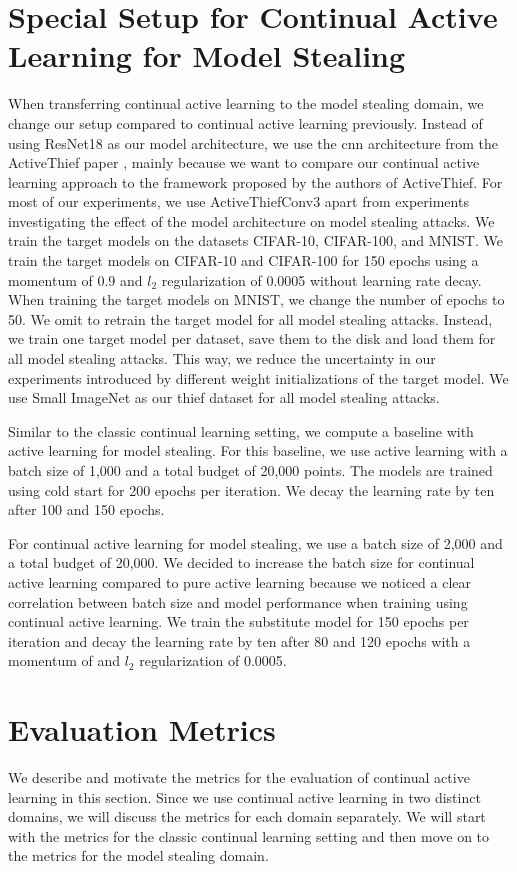 \section{Special Setup for Continual Active Learning for Model Stealing}
\label{sec:Methodology:CALMSsetup}
When transferring continual active learning to the model stealing domain, we change our setup compared to continual active learning previously. Instead of using ResNet18 as our
model architecture, we use the \gls{cnn} architecture from the ActiveThief paper \cite{pal2020activethief}, mainly because we want to compare our continual active learning approach to
the framework proposed by the authors of ActiveThief. For most of our experiments, we use ActiveThiefConv3 apart from experiments investigating the effect of the model 
architecture on model stealing attacks. We train the target models on the datasets CIFAR-10, CIFAR-100, and MNIST. We train the target models on CIFAR-10 and CIFAR-100 for
150 epochs using a momentum of 0.9 and $l_2$ regularization of 0.0005 without learning rate decay. When training the target models on MNIST, we change the number of epochs to 50.
We omit to retrain the target model for all model stealing attacks. Instead, we train one target model per dataset, save them to the disk and load them for all model stealing
attacks. This way, we reduce the uncertainty in our experiments introduced by different weight initializations of the target model. We use Small ImageNet as our thief dataset for all model stealing attacks. \par
Similar to the classic continual learning setting, we compute a baseline with active learning for model stealing. For this baseline, we use active learning with a batch size of 1,000
and a total budget of 20,000 points. The models are trained using cold start for 200 epochs per iteration. We decay the learning rate by ten after 100 and 150 epochs. \par
For continual active learning for model stealing, we use a batch size of 2,000 and a total budget of 20,000. We decided to increase the batch size for continual active learning compared
to pure active learning because we noticed a clear correlation between batch size and model performance when training using continual active learning. We train the substitute model for
150 epochs per iteration and decay the learning rate by ten after 80 and 120 epochs with a momentum of and $l_2$ regularization of 0.0005.

\section{Evaluation Metrics}
\label{sec:Methodology:Metrics}
We describe and motivate the metrics for the evaluation of continual active learning in this section. Since we use continual active learning in two distinct
domains, we will discuss the metrics for each domain separately. We will start with the metrics for the classic continual learning setting and then move on to the
metrics for the model stealing domain.

